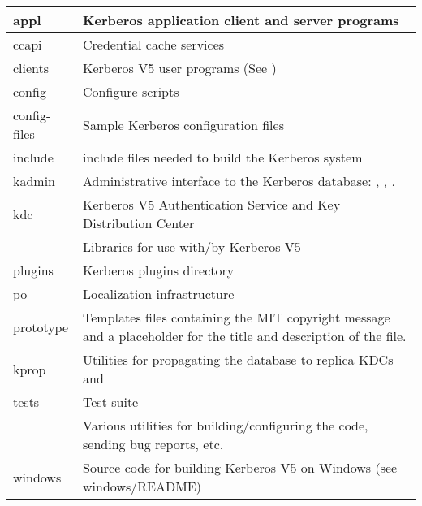 \documentclass[letterpaper,10pt,english]{sphinxmanual}
\begin{document}
\begin{savenotes}\sphinxattablestart
\centering
\begin{tabulary}{\linewidth}[t]{|T|T|}
\hline

appl
&
Kerberos application client and server programs
\\
\hline
ccapi
&
Credential cache services
\\
\hline
clients
&
Kerberos V5 user programs (See )
\\
\hline
config
&
Configure scripts
\\
\hline
config-files
&
Sample Kerberos configuration files
\\
\hline
include
&
include files needed to build the Kerberos system
\\
\hline
kadmin
&
Administrative interface to the Kerberos database: , , .
\\
\hline
kdc
&
Kerberos V5 Authentication Service and Key Distribution Center
\\
\hline
{\hyperref[\detokenize{build/directory_org:lib}]{}}
&
Libraries for use with/by Kerberos V5
\\
\hline
plugins
&
Kerberos plugins directory
\\
\hline
po
&
Localization infrastructure
\\
\hline
prototype
&
Templates files containing the MIT copyright message and a placeholder for the title and description of the file.
\\
\hline
kprop
&
Utilities for propagating the database to replica KDCs  and 
\\
\hline
tests
&
Test suite
\\
\hline
{\hyperref[\detokenize{build/directory_org:util}]{}}
&
Various utilities for building/configuring the code, sending bug reports, etc.
\\
\hline
windows
&
Source code for building Kerberos V5 on Windows (see windows/README)
\\
\hline
\end{tabulary}
\par
\sphinxattableend\end{savenotes}
\end{document}
